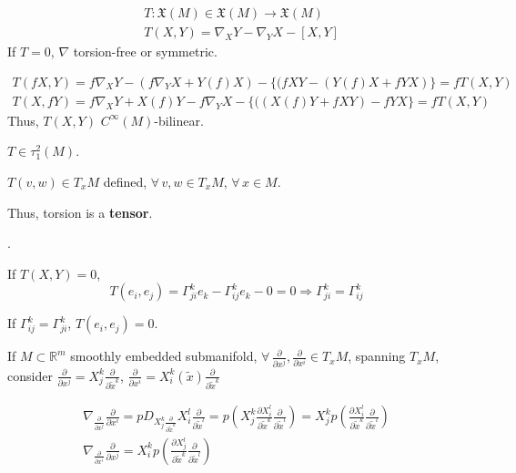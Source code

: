 \begin{definition}[torsion]
\begin{equation}
\begin{aligned}
	& T:\mathfrak{X}(M) \in \mathfrak{X}(M) \to \mathfrak{X}(M) \\ 
	& T(X,Y) = \nabla_XY - \nabla_Y X - [X,Y] 
\end{aligned}
\end{equation}
If $T=0$, $\nabla$ torsion-free or symmetric.  
\end{definition}
\[
\begin{gathered}
T(fX,Y) = f\nabla_XY - (f\nabla_Y X + Y(f)X) - \lbrace (fXY - (Y(f)X + fYX) \rbrace = fT(X,Y) \\ 
T(X,fY) = f\nabla_XY + X(f)Y - f\nabla_Y X   - \lbrace ( ( X(f) Y +fXY) -  fYX \rbrace = fT(X,Y)  
\end{gathered}
\]
Thus, $T(X,Y)$ $C^{\infty}(M)$-bilinear.  

$T\in \tau_1^2 (M)$.  

$T(v,w) \in T_xM$ defined, $\forall \, v,w \in T_xM$, $\forall \, x\in M$.

Thus, torsion is a \textbf{tensor}.

.  

If $T(X,Y)=0$,
\[
T(e_i,e_j) = \Gamma^k_{ji} e_k - \Gamma^k_{ij} e_k - 0 = 0 \Longrightarrow \Gamma_{ji}^k = \Gamma^k_{ij}
\]

If $\Gamma^k_{ij} = \Gamma^k_{ji}$, $T(e_i,e_j)=0$.  


If $M\subset \mathbb{R}^m$ smoothly embedded submanifold,  
$\forall \, \frac{ \partial }{ \partial x^j}, \frac{ \partial }{ \partial x^i} \in T_xM$, spanning $T_xM$, consider $\frac{ \partial }{ \partial x^j} = X^k_j \frac{ \partial }{ \partial \widetilde{x}^k}$, $\frac{ \partial }{ \partial x^i} = X_i^k(\widetilde{x}) \frac{ \partial }{ \partial \widetilde{x}^k}$  

\[
\begin{gathered}
	\nabla_{\frac{\partial }{ \partial x^j} } \frac{ \partial }{ \partial x^i} = p D_{ X^k_j \frac{ \partial }{ \partial \widetilde{x}^k } } X^l_i \frac{ \partial }{ \partial \widetilde{x}^l } = p \left( X^k_j \frac{ \partial X^l_i}{  \partial \widetilde{x}^k } \frac{ \partial }{ \partial \widetilde{x}^l } \right) =   X^k_j  p \left( \frac{ \partial X^l_i}{  \partial \widetilde{x}^k } \frac{ \partial }{ \partial \widetilde{x}^l } \right)  \\ 
	\nabla_{\frac{\partial }{ \partial x^i} } \frac{ \partial }{ \partial x^j} =  X^k_i p \left(  \frac{ \partial X^l_j }{ \partial \widetilde{x}^k }   \frac{ \partial }{ \partial \widetilde{x}^l  } \right) 
\end{gathered}
\]









